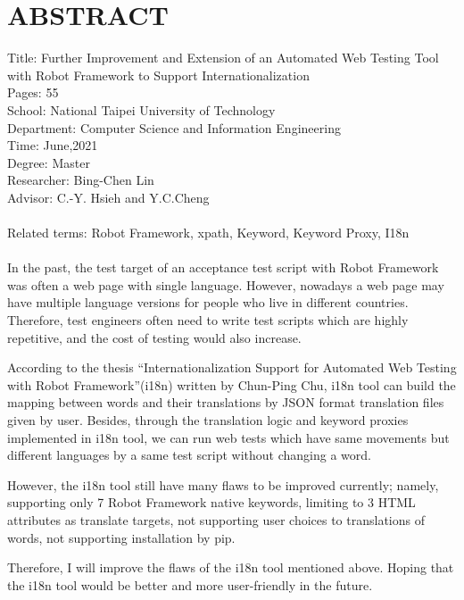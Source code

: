 \chapter*{ABSTRACT}


\noindent
Title: Further Improvement and Extension of an Automated Web Testing Tool 
with Robot Framework to Support Internationalization\\
Pages: 55\\
School: National Taipei University of Technology\\
Department: Computer Science and Information Engineering\\
Time: June,2021\\
Degree: Master\\
Researcher: Bing-Chen Lin\\
Advisor: C.-Y. Hsieh and Y.C.Cheng\\
\hspace*{\fill}\\
Related terms: Robot Framework, xpath, Keyword, Keyword Proxy, I18n\\
\hspace*{\fill}\\
%
\indent
In the past, the test target of an acceptance test script with Robot Framework 
was often a  web page with single language. However, 
nowadays a web page may have multiple language versions for people 
who live in different countries. Therefore, test engineers often need to 
write test scripts which are highly repetitive, 
and the cost of testing would also increase.

According to the thesis “Internationalization Support for Automated Web Testing
with Robot Framework”(i18n) written by Chun-Ping Chu, i18n tool can build 
the mapping between words and their translations by JSON format translation 
files given by user. Besides, through the translation logic and 
keyword proxies implemented in i18n tool, we can run web tests which have 
same movements but different languages by a same test script without changing a word.

However, the i18n tool still have many flaws to be improved currently; namely, 
supporting only 7 Robot Framework native keywords, limiting to 3 HTML attributes as translate targets, 
not supporting user choices to translations of words, not supporting installation by pip.

Therefore, I will improve the flaws of the i18n tool mentioned above. 
Hoping that the i18n tool would be better and more user-friendly in the future.

